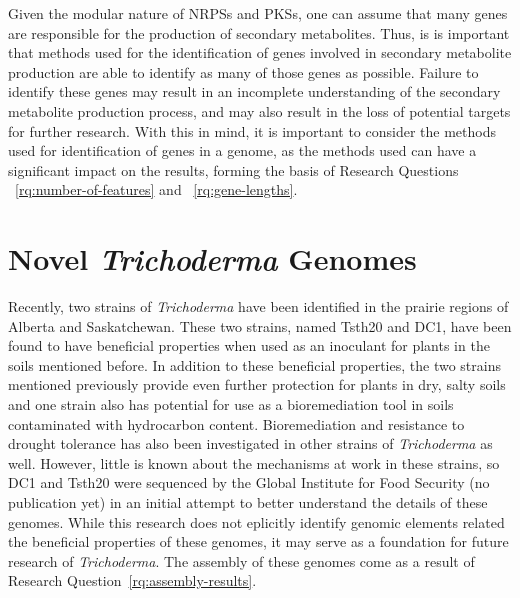  Given the modular nature of NRPSs and PKSs, one can assume that many genes are responsible for the production of secondary metabolites. Thus, is is important that methods used for the identification of genes involved in secondary metabolite production are able to identify as many of those genes as possible. Failure to identify these genes may result in an incomplete understanding of the secondary metabolite production process, and may also result in the loss of potential targets for further research. With this in mind, it is important to consider the methods used for identification of genes in a genome, as the methods used can have a significant impact on the results, forming the basis of Research Questions ~\ref{rq:number-of-features} and ~\ref{rq:gene-lengths}. 
 




\section{Novel \textit{Trichoderma} Genomes}

Recently, two strains of \textit{Trichoderma}
have been identified in the prairie regions of Alberta and
Saskatchewan. These two strains, named Tsth20 and DC1, have been found
to have beneficial properties when used as an inoculant for plants in
the soils mentioned before. In addition to these beneficial
properties, the two strains mentioned previously provide even further
protection for plants in dry, salty soils and one strain also has
potential for use as a bioremediation tool in soils contaminated with
hydrocarbon content. Bioremediation and resistance to drought
tolerance has also been investigated in other strains of
\textit{Trichoderma} as well\cite{10.3389/fpls.2023.1190304}. However,
little is known about the mechanisms at work in these strains, so DC1
and Tsth20 were sequenced by the Global Institute for Food Security
(no publication yet) in an initial attempt to better understand the
details of these genomes. While this research does not eplicitly
identify genomic elements related the beneficial properties of these
genomes, it may serve as a foundation for future research of
\textit{Trichoderma}. The assembly of these genomes come as a result of Research Question~\ref{rq:assembly-results}.

